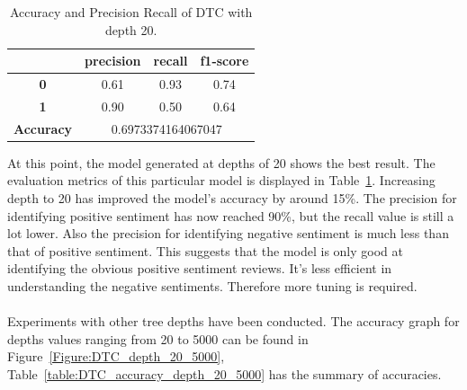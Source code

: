 \documentclass[a4paper]{report}
\begin{document}
{{\begin{table}[h]
\centering
\begin{tabular}{  c | c | c | c |}
\cline{2-4}
&  \textbf { precision } &  \textbf  { recall } & \textbf  { f1-score } \\
\hline
\multicolumn{1}{|c|}{ \textbf {0}} & 0.61 & 0.93 & 0.74 \\
\hline
\multicolumn{1}{|c|}{ \textbf {1}} & 0.90 & 0.50 & 0.64 \\
\hline
\hline
\multicolumn{1}{|c|}{ \textbf {Accuracy}} & \multicolumn{3}{|c|}{0.6973374164067047} \\
\hline
\end{tabular}
\caption{Accuracy and Precision Recall of DTC with depth 20.}
\label{table:DTC_depth_20_performance}
\end{table}

\noindent
At this point, the model generated at depths of 20 shows the best result. The evaluation metrics of this particular model is displayed in Table~\ref{table:DTC_depth_20_performance}. Increasing depth to 20 has improved the model's accuracy by around 15\%. The precision for identifying positive sentiment has now reached 90\%, but the recall value is still a lot lower. Also the precision for identifying negative sentiment is much less than that of positive sentiment. This suggests that the model is only good at identifying the obvious positive sentiment reviews. It's less efficient in understanding the negative sentiments. Therefore more tuning is required.
\\\\
Experiments with other tree depths have been conducted. The accuracy graph for depths values ranging from 20 to 5000 can be found in Figure~\ref{Figure:DTC_depth_20_5000}, Table~\ref{table:DTC_accuracy_depth_20_5000}  has the summary of accuracies.

}}
\end{document}
